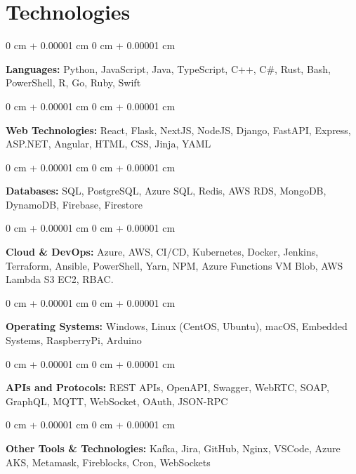 \documentclass[10pt, letterpaper]{article}
\newenvironment{onecolentry}{
    \begin{adjustwidth}{
        0 cm + 0.00001 cm
    }{
        0 cm + 0.00001 cm
    }
}{
    \end{adjustwidth}
} %
\begin{document}
    \section{Technologies}
        \begin{onecolentry}
            \textbf{Languages:} Python, JavaScript, Java, TypeScript, C++, C\#, Rust, Bash, PowerShell, R, Go, Ruby, Swift
        \end{onecolentry}
        \begin{onecolentry}
            \textbf{Web Technologies:} React, Flask, NextJS, NodeJS, Django, FastAPI, Express, ASP.NET, Angular, HTML, CSS, Jinja, YAML
        \end{onecolentry}
        \begin{onecolentry}
            \textbf{Databases:} SQL, PostgreSQL, Azure SQL, Redis, AWS RDS, MongoDB, DynamoDB, Firebase, Firestore
        \end{onecolentry}
        \begin{onecolentry}
            \textbf{Cloud \& DevOps:} Azure, AWS, CI/CD, Kubernetes, Docker, Jenkins, Terraform, Ansible, PowerShell, Yarn, NPM, Azure Functions VM Blob, AWS Lambda S3 EC2, RBAC.
        \end{onecolentry}
        \begin{onecolentry}
            \textbf{Operating Systems:} Windows, Linux (CentOS, Ubuntu), macOS, Embedded Systems, RaspberryPi, Arduino
        \end{onecolentry}
        \begin{onecolentry}
            \textbf{APIs and Protocols:} REST APIs, OpenAPI, Swagger, WebRTC, SOAP, GraphQL, MQTT, WebSocket, OAuth, JSON-RPC
        \end{onecolentry}
        \begin{onecolentry}
            \textbf{Other Tools \& Technologies:} Kafka, Jira, GitHub, Nginx, VSCode, Azure AKS, Metamask, Fireblocks, Cron, WebSockets
        \end{onecolentry}


    
\end{document}
